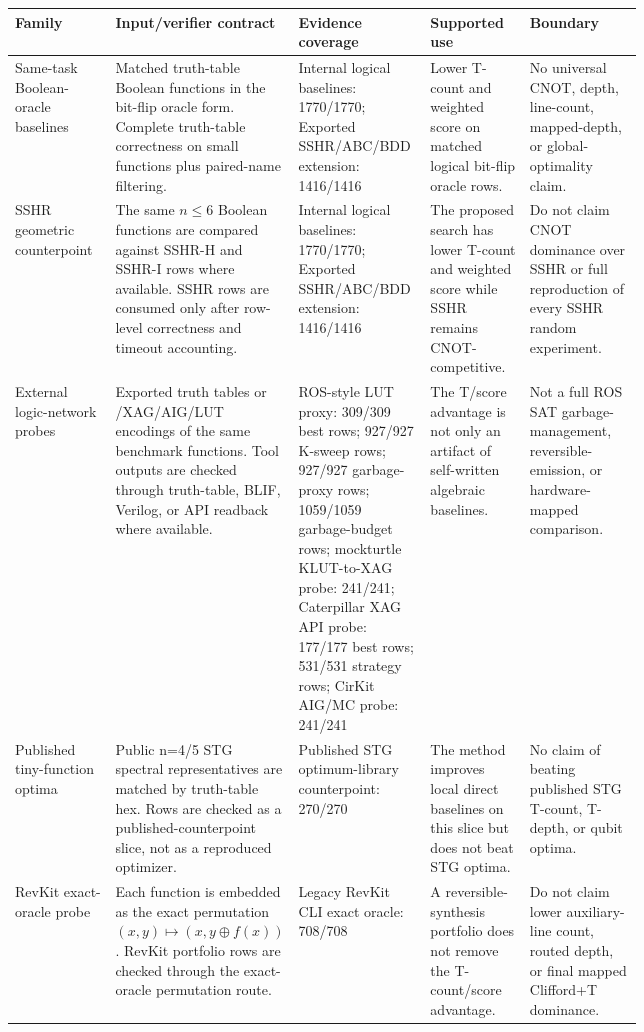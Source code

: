\begin{tabularx}{\linewidth}{>{\raggedright\arraybackslash}p{0.16\linewidth}>{\raggedright\arraybackslash}p{0.18\linewidth}>{\raggedright\arraybackslash}p{0.21\linewidth}>{\raggedright\arraybackslash}X>{\raggedright\arraybackslash}p{0.18\linewidth}}
\toprule
Family & Input/verifier contract & Evidence coverage & Supported use & Boundary \\
\midrule
Same-task Boolean-oracle baselines & Matched truth-table Boolean functions in the bit-flip oracle form. Complete truth-table correctness on small functions plus paired-name filtering. & Internal logical baselines: 1770/1770; Exported SSHR/ABC/BDD extension: 1416/1416 & Lower T-count and weighted score on matched logical bit-flip oracle rows. & No universal CNOT, depth, line-count, mapped-depth, or global-optimality claim. \\
SSHR geometric counterpoint & The same $n\leq6$ Boolean functions are compared against SSHR-H and SSHR-I rows where available. SSHR rows are consumed only after row-level correctness and timeout accounting. & Internal logical baselines: 1770/1770; Exported SSHR/ABC/BDD extension: 1416/1416 & The proposed search has lower T-count and weighted score while SSHR remains CNOT-competitive. & Do not claim CNOT dominance over SSHR or full reproduction of every SSHR random experiment. \\
External logic-network probes & Exported truth tables or \anf{}/XAG/AIG/LUT encodings of the same benchmark functions. Tool outputs are checked through truth-table, BLIF, Verilog, or API readback where available. & ROS-style LUT proxy: 309/309 best rows; 927/927 K-sweep rows; 927/927 garbage-proxy rows; 1059/1059 garbage-budget rows; mockturtle KLUT-to-XAG probe: 241/241; Caterpillar XAG API probe: 177/177 best rows; 531/531 strategy rows; CirKit AIG/MC probe: 241/241 & The T/score advantage is not only an artifact of self-written algebraic baselines. & Not a full ROS SAT garbage-management, reversible-emission, or hardware-mapped comparison. \\
Published tiny-function optima & Public n=4/5 STG spectral representatives are matched by truth-table hex. Rows are checked as a published-counterpoint slice, not as a reproduced optimizer. & Published STG optimum-library counterpoint: 270/270 & The method improves local direct baselines on this slice but does not beat STG optima. & No claim of beating published STG T-count, T-depth, or qubit optima. \\
RevKit exact-oracle probe & Each function is embedded as the exact permutation $(x,y)\mapsto(x,y\oplus f(x))$. RevKit portfolio rows are checked through the exact-oracle permutation route. & Legacy RevKit CLI exact oracle: 708/708 & A reversible-synthesis portfolio does not remove the T-count/score advantage. & Do not claim lower auxiliary-line count, routed depth, or final mapped Clifford+T dominance. \\

\end{tabularx}
